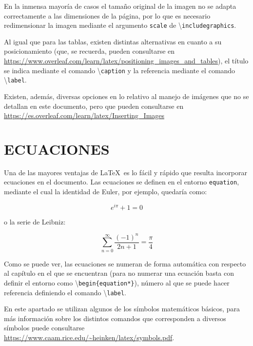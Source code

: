 \documentclass[a4paper, 11pt, spanish, twoside]{article}
\begin{document}
En la inmensa mayoría de casos el tamaño original de la imagen no se adapta correctamente a las dimensiones de la página, por lo que es necesario redimensionar la imagen mediante el argumento \texttt{scale} de \textbackslash\texttt{includegraphics}. 

Al igual que para las tablas, existen distintas alternativas en cuanto a su posicionamiento (que, se recuerda, pueden consultarse en \url{https://www.overleaf.com/learn/latex/positioning_images_and_tables}), el título se indica mediante el comando \textbackslash\texttt{caption} y la referencia mediante el comando \textbackslash\texttt{label}. 

Existen, además, diversas opciones en lo relativo al manejo de imágenes que no se detallan en este documento, pero que pueden consultarse en \url{https://es.overleaf.com/learn/latex/Inserting_Images} 




\newpage
\section{ECUACIONES} \label{sec:ecuaciones}

Una de las mayores ventajas de \LaTeX \ es lo fácil y rápido que resulta incorporar ecuaciones en el documento. Las ecuaciones se definen en el entorno \texttt{equation}, mediante el cual la identidad de Euler, por ejemplo, quedaría como:

\begin{equation}
    e^{i\pi} + 1 = 0
    \label{eq:euler}
\end{equation}

o la serie de Leibniz:

\begin{equation}
    \sum_{n=0}^\infty \frac{(-1)^n}{2n+1} = \frac{\pi}{4}
    \label{eq:leibniz}
\end{equation}

Como se puede ver, las ecuaciones se numeran de forma automática con respecto al capítulo en el que se encuentran (para no numerar una ecuación basta con definir el entorno como \textbackslash\texttt{begin\{equation*\}}), número al que se puede hacer referencia definiendo el comando \textbackslash\texttt{label}.

En este apartado se utilizan algunos de los símbolos matemáticos básicos, para más información sobre los distintos comandos que corresponden a diversos símbolos puede consultarse \url{https://www.caam.rice.edu/~heinken/latex/symbols.pdf}.
\end{document}
